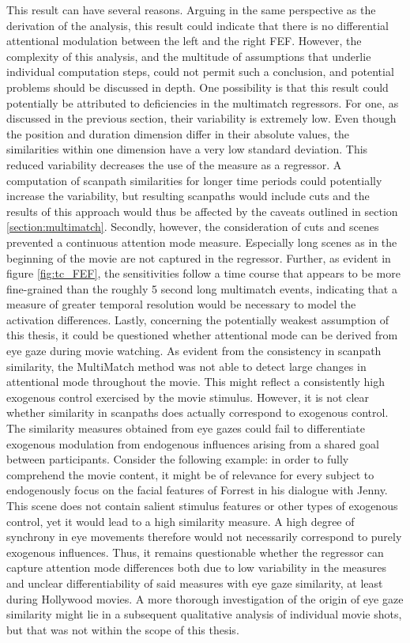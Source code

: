 \documentclass[a4paper, 12pt]{scrreprt}
\begin{document}
This result can have several reasons. Arguing in the same perspective as the derivation of the analysis, this result could indicate that there is no differential attentional modulation between the left and the right FEF. However, the complexity of this analysis, and the multitude of assumptions that underlie individual computation steps, could not permit such a conclusion, and potential problems should be discussed in depth. One possibility is that this result could potentially be attributed to deficiencies in the multimatch regressors. For one, as discussed in the previous section, their variability is extremely low. Even though the position and duration dimension differ in their absolute values, the similarities within one dimension have a very low standard deviation. This reduced variability decreases the use of the measure as a regressor. A computation of scanpath similarities for longer time periods could potentially increase the variability, but resulting scanpaths would include cuts and the results of this approach would thus be affected by the caveats outlined in section \ref{section:multimatch}. Secondly, however, the consideration of cuts and scenes prevented a continuous attention mode measure. Especially long scenes as in the beginning of the movie are not captured in the regressor. Further, as evident in figure \ref{fig:tc_FEF}, the sensitivities follow a time course that appears to be more fine-grained than the roughly 5 second long multimatch events, indicating that a measure of greater temporal resolution would be necessary to model the activation differences. Lastly, concerning the potentially weakest assumption of this thesis, it could be questioned whether attentional mode can be derived from eye gaze during movie watching. As evident from the consistency in scanpath similarity, the MultiMatch method was not able to detect large changes in attentional mode throughout the movie. This might reflect a consistently high exogenous control exercised by the movie stimulus. However, it is not clear whether similarity in scanpaths does actually correspond to exogenous control. The similarity measures obtained from eye gazes could fail to differentiate exogenous modulation from endogenous influences arising from a shared goal between participants. Consider the following example: in order to fully comprehend the movie content, it might be of relevance for every subject to endogenously focus on the facial features of Forrest in his dialogue with Jenny. This scene does not contain salient stimulus features or other types of exogenous control, yet it would lead to a high similarity measure. A high degree of synchrony in eye movements therefore would not necessarily correspond to purely exogenous influences. Thus, it remains questionable whether the regressor can capture attention mode differences both due to low variability in the measures and unclear differentiability of said measures with eye gaze similarity, at least during Hollywood movies. A more thorough investigation of the origin of eye gaze similarity might lie in a subsequent qualitative analysis of individual movie shots, but that was not within the scope of this thesis. \\
\end{document}
